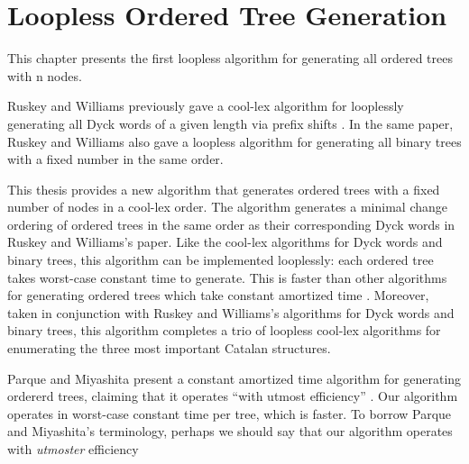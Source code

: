 \section{Loopless Ordered Tree Generation}
This chapter presents the first loopless algorithm for generating all ordered trees with n nodes. 

Ruskey and Williams previously gave a cool-lex algorithm for looplessly generating all Dyck words  of a given length via prefix shifts \cite{ruskey2008generating}.  In the same paper, Ruskey and Williams also gave a loopless algorithm for generating all binary trees with a fixed number in the same order.

This thesis provides a new algorithm that generates ordered trees with a fixed number of nodes in a cool-lex order. The algorithm generates a minimal change ordering of ordered trees in the same order as their corresponding Dyck words in Ruskey and Williams's paper. Like the cool-lex algorithms for Dyck words and binary trees, this algorithm can be implemented looplessly: each ordered tree takes worst-case constant time to generate. This is faster than other algorithms for generating ordered trees which take constant amortized time \cite{parque2021efficient} \cite{er1985lexotrees} \cite{zaks1980lexotrees} \cite{skarbek1988pointerotrees}. Moreover, taken in conjunction with Ruskey and Williams's algorithms for Dyck words and binary trees, this algorithm completes a trio of loopless cool-lex algorithms for enumerating the three most important Catalan structures.


Parque and Miyashita present a constant amortized time algorithm for generating ordererd trees, claiming that it operates ``with utmost efficiency'' \cite{parque2021efficient}.  Our algorithm operates in worst-case constant time per tree, which is faster. To borrow Parque and Miyashita's terminology, perhaps we should say that our algorithm operates with \emph{utmoster} efficiency

